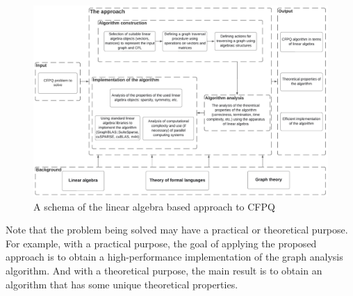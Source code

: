 \begin{figure}
    \centering
	\includegraphics[width = 17.7cm]{Dissertation/images/schema_eng.pdf}
	\caption{A schema of the linear algebra based approach to CFPQ}
	\label{fig:schema}
\end{figure}

Note that the problem being solved may have a practical or theoretical purpose. For example, with a practical purpose, the goal of applying the proposed approach is to obtain a high-performance implementation of the graph analysis algorithm. And with a theoretical purpose, the main result is to obtain an algorithm that has some unique theoretical properties.

